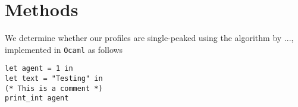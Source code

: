 \chapter{Methods}
\label{Methods}

We determine whether our profiles are single-peaked using the algorithm by ..., implemented in \texttt{Ocaml} as follows

\begin{lstlisting}[language=caml]
let agent = 1 in
let text = "Testing" in
(* This is a comment *)
print_int agent
\end{lstlisting}
